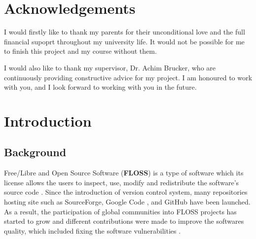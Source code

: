 \documentclass[12pt, a4paper]{report}
\begin{document}
\newpage


\chapter*{Acknowledgements}
I would firstly like to thank my parents for their unconditional love and the full financial supoprt
throughout my university life. It would not be possible for me to finish this project and my course
without them.

I would also like to thank my supervisor, Dr. Achim Brucker, who are continuously providing
constructive advice for my project. I am honoured to work with you, and I look forward to working
with you in the future.

\newpage

\tableofcontents


\listoftables

\newpage


\chapter{Introduction}
\section{Background}
Free/Libre and Open Source Software (\textbf{FLOSS}) is a type of software which its license allows
the users to inspect, use, modify and redistribute the software's source code \cite{crowston_2012}.
Since the introduction of version control system, many repositories hosting site such as
SourceForge\cite{sourceforge}, Google Code \cite{google_code}, and GitHub \cite{github} have been
launched. As a result, the participation of global communities into FLOSS projects has started to
grow and different contributions were made to improve the softwares quality, which included fixing
the software vulnerabilities \cite{dabbish_2012}.
\end{document}
